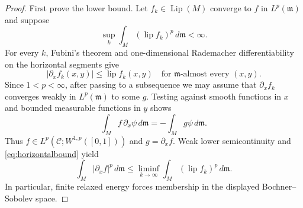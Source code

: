 \documentclass[11pt]{article}
\newcommand{\Ccal}{\mathcal C}
\newcommand{\Lip}{\operatorname{Lip}}
\newcommand{\lipc}{\operatorname{lip}}
\newcommand{\m}{\mathfrak m}
\begin{document}
\begin{proof}
First prove the lower bound.  Let $f_k\in\Lip(M)$ converge to $f$ in
$L^p(\m)$ and suppose
\[
              \sup_k\int_M(\lipc f_k)^p\,d\m<\infty.
\]
For every $k$, Fubini's theorem and one-dimensional Rademacher
differentiability on the horizontal segments give
\begin{equation}\label{eq:horizontalbound}
       |\partial_x f_k(x,y)|\leq\lipc f_k(x,y)
       \quad\text{for $\m$-almost every $(x,y)$.}
\end{equation}
Since $1<p<\infty$, after passing to a subsequence we may assume that
$\partial_xf_k$ converges weakly in $L^p(\m)$ to some $g$.  Testing against
smooth functions in $x$ and bounded measurable functions in $y$ shows
\[
 \int_M f\,\partial_x\psi\,d\m=-\int_Mg\psi\,d\m.
\]
Thus $f\in L^p(\Ccal;W^{1,p}([0,1]))$ and $g=\partial_xf$.  Weak lower
semicontinuity and \eqref{eq:horizontalbound} yield
\begin{equation}\label{eq:lower}
 \int_M|\partial_xf|^p\,d\m
 \leq\liminf_{k\to\infty}\int_M(\lipc f_k)^p\,d\m.
\end{equation}
In particular, finite relaxed energy forces membership in the displayed
Bochner--Sobolev space.


\end{proof}
\end{document}
